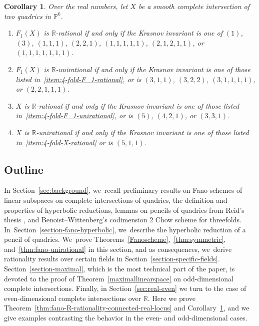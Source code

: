 \documentclass[JEP,XML,SOM,Unicode,NoEqCountersInSection,published]{cedram}
\let\bb\mathbb\let\Bbb\mathbb
\theoremstyle{plain}
\newtheorem{cor}[thm]{Corollary}
\theoremstyle{definition}
\renewcommand\P{\mathbb{P}}
\newcommand\R{\mathbb{R}}
\begin{document}
\begin{cor}\label{cor:classification}
Over the real numbers, let $X$ be a smooth complete intersection of two quadrics in $\P^6$.
\begin{enumerate}
\item\label{item:4-fold-F_1-rational} $F_1(X)$ is $\R$-rational if and only if the Krasnov invariant is one of
$(1)$, $(3)$, $(1,1,1)$, $(2,2,1)$, $(1,1,1,1,1)$, $(2,1,2,1,1)$, or $(1,1,1,1,1,1,1)$.
\item\label{item:4-fold-F_1-unirational} $F_1(X)$ is $\R$-unirational
if and only if
the Krasnov invariant is one of those listed in~\eqref{item:4-fold-F_1-rational}, or is
$(3,1,1)$, $(3,2,2)$, $(3,1,1,1,1)$, or $(2,2,1,1,1)$.
\item\label{item:4-fold-X-rational} \cite[Th.\,1.1]{HassettKoll'arTschinkel} $X$ is $\R$-rational if and only if the Krasnov invariant is one of those listed in~\eqref{item:4-fold-F_1-unirational}, or is $(5)$, $(4,2,1)$, or $(3,3,1)$.
\item $X$ is $\R$-unirational
if and only if
the Krasnov invariant is one of those listed in~\eqref{item:4-fold-X-rational} or is $(5,1,1)$.
\end{enumerate}
\end{cor}

\subsection{Outline}
In Section~\ref{sec:background}, we~recall preliminary results on Fano schemes of linear subspaces on complete intersections of quadrics, the definition and properties of hyperbolic reductions, lemmas on pencils of quadrics from Reid's thesis \cite{Reid-thesis}, and Benoist--Wittenberg's codimension 2 Chow scheme for threefolds. In~Section~\ref{section-fano-hyperbolic}, we~describe the hyperbolic reduction of a pencil of quadrics. We~prove Theorems~\ref{Fanoscheme},~\ref{thm:symmetric}, and~\ref{thm:fano-unirational} in this section, and as consequences, we~derive rationality results over certain fields in Section~\ref{section-specific-fields}. Section~\ref{section-maximal}, which is the most technical part of the paper, is devoted to the proof of Theorem~\ref{maximallinearspace} on odd-dimensional complete intersections. Finally, in Section~\ref{sec:real-even} we turn to the case of even-dimensional complete intersections over \(\bb R\). Here we prove Theorem~\ref{thm:fano-R-rationality-connected-real-locus} and Corollary~\ref{cor:classification}, and we give examples contrasting the behavior in the even- and odd-dimensional cases.
\end{document}

